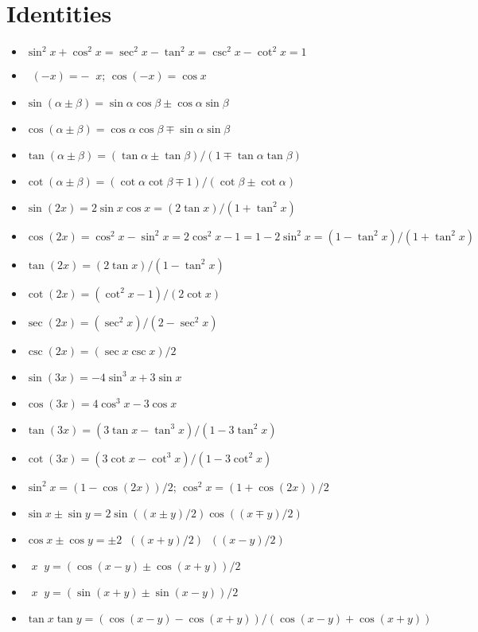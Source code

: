 \documentclass{slnotes}
\begin{document}
\chapter{Identities}
\begin{itemize}
\item \(\sin^2 x+\cos^2 x = \sec^2 x - \tan^2 x = \csc^2 x - \cot^2 x = 1\)
\item \(\mathop{{}^{\sin}_{\tan}{}}(-x) = -\mathop{{}^{\sin}_{\tan}} x\); \(\cos(-x) = \cos x\)
\item \(\sin(\alpha\pm\beta) = \sin\alpha\cos\beta\pm\cos\alpha\sin\beta\)
\item \(\cos(\alpha\pm\beta) = \cos\alpha\cos\beta\mp\sin\alpha\sin\beta\)
\item \(\tan(\alpha\pm\beta) = (\tan\alpha\pm\tan\beta)/(1\mp\tan\alpha\tan\beta)\)
\item \(\cot(\alpha\pm\beta) = (\cot\alpha\cot\beta\mp 1)/(\cot\beta\pm\cot\alpha)\)
\item \(\sin(2x) = 2\sin x\cos x = (2\tan x)/(1+\tan^2 x)\)
\item \(\cos(2x) = \cos^2 x-\sin^2 x = 2\cos^2 x - 1 = 1 - 2\sin^2 x = (1-\tan^2 x)/(1+\tan^2 x)\)
\item \(\tan(2x) = (2\tan x)/(1-\tan^2 x)\)
\item \(\cot(2x) = (\cot^2 x - 1)/(2\cot x)\)
\item \(\sec(2x) = (\sec^2 x)/(2 - \sec^2 x)\)
\item \(\csc(2x) = (\sec x\csc x)/2\)
\item \(\sin(3x) = -4\sin^3x+3\sin x\)
\item \(\cos(3x) = 4\cos^3x-3\cos x\)
\item \(\tan(3x) = (3\tan x-\tan^3x)/(1-3\tan^2x)\)
\item \(\cot(3x) = (3\cot x-\cot^3x)/(1-3\cot^2x)\)
\item \(\sin^2x = (1-\cos(2x))/2\); \(\cos^2x = (1+\cos(2x))/2\)
\item \(\sin x\pm\sin y = 2\sin((x\pm y)/2)\cos((x\mp y)/2)\)
\item \(\cos x\pm\cos y = \pm2\mathop{{}^{\cos}_{\sin}{}}((x+y)/2)\mathop{{}^{\cos}_{\sin}{}}((x-y)/2)\)
\item \(\mathop{{}^{\cos}_{\sin}{}}x\mathop{{}^{\cos}_{\sin}{}}y = (\cos(x-y)\pm\cos(x+y))/2\)
\item \(\mathop{{}^{\sin}_{\cos}{}}x\mathop{{}^{\cos}_{\sin}{}}y = (\sin(x+y)\pm\sin(x-y))/2\)
\item \(\tan x\tan y = (\cos(x-y)-\cos(x+y))/(\cos(x-y)+\cos(x+y))\)
\end{itemize}
\end{document}
